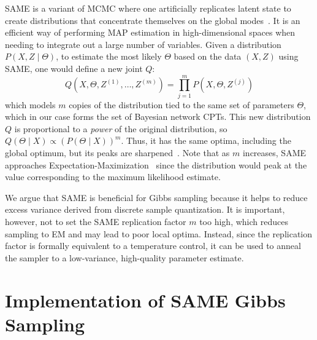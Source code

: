 \documentclass{article} %
\begin{document}
SAME is a variant of MCMC where one artificially replicates latent state to create distributions that
concentrate themselves on the global modes~\citep{SAME2002}. It is an efficient way of performing
MAP estimation in high-dimensional spaces when needing to integrate out a large number of variables.
Given a distribution $P(X,Z\mid \Theta)$, to estimate the most likely $\Theta$ based on the data
$(X,Z)$ using SAME, one would define a new joint $Q$:
\begin{equation}\label{eq:same}
Q(X,\Theta,Z^{(1)},\ldots,Z^{(m)}) = \prod_{j=1}^m P(X,\Theta,Z^{(j)})
\end{equation}
which models $m$ copies of the distribution tied to the same set of parameters $\Theta$, which in
our case forms the set of Bayesian network CPTs. This new distribution $Q$ is proportional to a
\emph{power} of the original distribution, so $Q(\Theta \mid X) \propto (P(\Theta \mid X))^m$. Thus,
it has the same optima, including the global optimum, but its peaks are sharpened~\citep{SAME2002}.
Note that as $m$ increases, SAME approaches Expectation-Maximization~\citep{EMpaper} since the
distribution would peak at the value corresponding to the maximum likelihood estimate.

We argue that SAME is beneficial for Gibbs sampling because it helps
to reduce excess variance derived from discrete sample quantization.
It is important, however, not to set the SAME replication factor $m$
too high, which reduces sampling to EM and may lead to poor local
optima. Instead, since the replication factor is formally equivalent
to a temperature control, it can be used to anneal the sampler to a
low-variance, high-quality parameter estimate.






\section{Implementation of SAME Gibbs Sampling}\label{sec:implementation}
\end{document}

